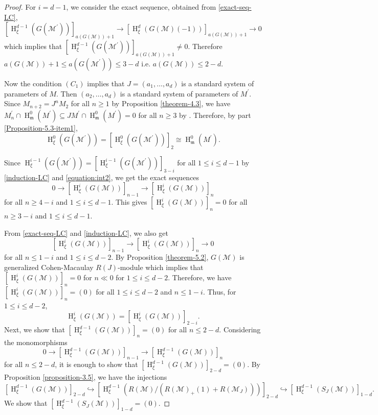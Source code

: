 \documentclass[11pt,reqno]{amsart}
\theoremstyle{definition}
\newcommand{\m}{\mathfrak m}
\def\M{{\mathcal M}}
\DeclareMathOperator{\h}{H}
\numberwithin{equation}{section}
\begin{document}
\begin{proof}
	For $i=d-1$, we consider the exact sequence, obtained from  \eqref{exact-seq-LC},  $$[\h^{d-1}_{\xi}(G(\M^\prime))]_{a(G(\M))+1}\to  [\h^d_{\xi}(G(\M)(-1))]_{a(G(\M))+1}\to 0$$
	which implies that $[\h^{d-1}_{\xi}(G(\M^\prime))]_{a(G(\M))+1}\neq 0$. Therefore $a(G(\M))+1\leq a(G(\M^\prime))\leq 3-d$ i.e. $a(G(\M))\leq 2-d.$
	
	Now the condition $(C_1)$ implies that $J=(a_1,\ldots,a_d)$ is a standard system of parameters of $M$. Then $(a_2,\ldots,a_d)$ is a standard
	system of parameters of $M^\prime.$ Since  $M_{n+2}=J^n M_2$ for all $n\geq 1$ by Proposition \ref{theorem-4.3}, we have 
	$M^\prime_n\cap \h_{\m}^0(M^\prime)\subseteq JM^\prime\cap \h^0_{\m}(M^\prime)=0$ for all $n\geq 3$ by \cite[Corollary 2.3]{trung-gcm}. Therefore, 
	by part \ref{Proposition-5.3-item1}, 
	\begin{equation}\label{equation:int2}\h^0_{\xi}(G(\M^\prime))=[\h^0_{\xi}(G(\M^\prime))]_2\cong\h^0_\m(M^\prime).\end{equation}
	
	Since
	$\h^{i-1}_{\xi}(G(\M^\prime))=[\h^{i-1}_{\xi}(G(\M^\prime))]_{3-i}$ for all $1\leq i\leq d-1$ by  \eqref{induction-LC} and \eqref{equation:int2}, we get the exact sequences 
	$$0\to [\h^i_{\xi}(G(\M))]_{n-1}\to[\h^i_{\xi}(G(\M))]_n $$
	for all $n\geq 4-i$ and $1\leq i\leq d-1$.
	This gives  $[\h^i_{\xi}(G(\M))]_n=0$ for all $n\geq 3-i$ and $1\leq i\leq d-1.$
	
	From \eqref{exact-seq-LC} and \eqref{induction-LC}, we also get 
	$$[\h^i_{\xi}(G(\M))]_{n-1}\to[\h^i_{\xi}(G(\M))]_n\to 0$$
	for all $n\leq 1-i$ and $1\leq i\leq d-2$. 
	By Proposition \ref{theorem-5.2}, $G(\M)$ is generalized Cohen-Macaulay $R(J)$-module which implies that $[\h^i_{\xi}(G(\M))]_n=0$ for $n\ll 0 $ for $1\leq i\leq d-2$. Therefore, we have 
	$[\h^i_{\xi}(G(\M))]_n=(0)$ for all $1\leq i\leq d-2$ and $n\leq 1-i$. Thus, 	for $1\leq i\leq d-2$,
	$$\h^i_{\xi}(G(\M))=[\h^i_{\xi}(G(\M))]_{2-i}.$$
	Next, we show that $[\h^{d-1}_{\xi}(G(\M))]_n=(0)$ for all $n\leq 2-d$. Considering the monomorphisms
	$$0\to [\h^{d-1}_{\xi}(G(\M))]_{n-1}\to [\h^{d-1}_{\xi}(G(\M))]_n$$
	for all $n\leq 2-d$, it is enough to show that  $[\h^{d-1}_{\xi}(G(\M))]_{2-d}=(0).$ 
	By Proposition \ref{proposition-3.5}, we have the injections
	\begin{equation}\label{equation-int1}
		[\h^{d-1}_\xi(G(\M))]_{2-d}\hookrightarrow [\h^{d-1}_{\xi}(R(\M)/(R(\M)_+(1)+R(\M_J)))]_{2-d}\hookrightarrow [\h^{d-1}_\xi(S_J(\M))]_{1-d}.\end{equation}       
	We show that $[\h^{d-1}_{\xi}(S_J(\M))]_{1-d}=(0)$. 


\end{proof}
\end{document}
